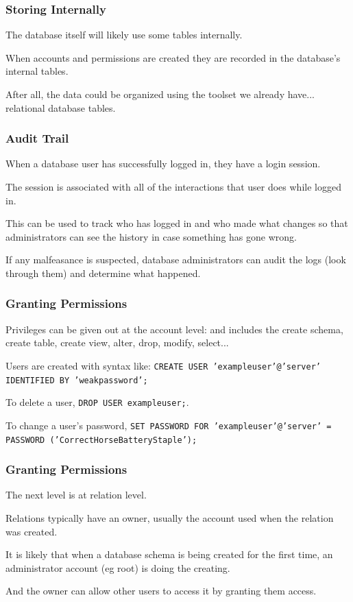 \begin{frame}
\frametitle{Storing Internally}

The database itself will likely use some tables internally.

When accounts and permissions are created they are recorded in the database's internal tables. 

After all, the data could be organized using the toolset we already have... relational database tables. 



\end{frame}



\begin{frame}
\frametitle{Audit Trail}

When a database user has successfully logged in, they have a \alert{login session}.

The session is associated with all of the interactions that user does while logged in. 

This can be used to track who has logged in and who made what changes so that administrators can see the history in case something has gone wrong. 

If any malfeasance is suspected, database administrators can audit the logs (look through them) and determine what happened.  


\end{frame}



\begin{frame}
\frametitle{Granting Permissions}

Privileges can be given out at the account level: and includes the create schema, create table, create view, alter, drop, modify, select... 

Users are created with syntax like: \texttt{CREATE USER 'exampleuser'@'server' IDENTIFIED BY 'weakpassword';} 

To delete a user, \texttt{DROP USER exampleuser;}. 
 
To change a user's password, \texttt{SET PASSWORD FOR 'exampleuser'@'server' = PASSWORD ('CorrectHorseBatteryStaple');}

\end{frame}



\begin{frame}
\frametitle{Granting Permissions}

The next level is at relation level. 

Relations typically have an owner, usually the account used when the relation was created. 

It is likely that when a database schema is being created for the first time, an administrator account (eg root) is doing the creating. 

And the owner can allow other users to access it by \alert{granting} them access.


\end{frame}



